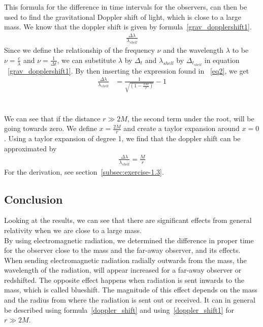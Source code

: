 \documentclass[reprint,english,notitlepage]{revtex4-2}
\begin{document}
        This formula for the difference in time intervals for the observers, can then be used to find the gravitational Doppler shift of light, which is close to a large mass.
        We know that the doppler shift is given by formula~\eqref{grav_dopplershift1}.
        \begin{align}
            \frac{\Delta \lambda}{\lambda_{shell}} \label{grav_dopplershift1}
        \end{align}
        Since we define the relationship of the frequency $\nu$ and the wavelength $\lambda$ to be $\nu = \frac{c}{\lambda}$ and $\nu = \frac{1}{\Delta t}$, we can substitute $\lambda$ by $\Delta_t$ and $\lambda_{shell}$ by $\Delta_t_{shell}$ in equation ~\eqref{grav_dopplershift1}.
        By then inserting the expression found in ~\eqref{eq2}, we get
        \begin{align}
            \frac{\Delta \lambda}{\lambda_{shell}} &= \frac{1}{\sqrt{\left(1-\frac{2M}{r}\right)}} - 1 \label{doppler_shift}
        \end{align}\\\\

        We can see that if the distance $r \gg 2M$, the second term under the root, will be going towards zero.
        We define $x = \frac{2M}{r}$ and create a taylor expansion around $x = 0$.
        Using a taylor expansion of degree 1, we find that the doppler shift can be approximated by
        \begin{align}
            \frac{\Delta \lambda}{\lambda_{shell}} = \frac{M}{r} \label{doppler_shift1}
        \end{align}
        For the derivation, see section~\ref{subsec:exercise-1.3}.
        


    \subsection{Conclusion}\label{subsec:conclusion1}
        Looking at the results, we can see that there are significant effects from general relativity when we are close to a large mass.\\
        By using electromagnetic radiation, we determined the difference in proper time for the observer close to the mass and the far-away observer, and its effects.\\

        When sending electromagnetic radiation radially outwards from the mass, the wavelength of the radiation, will appear increased for a far-away observer or redshifted.
        The opposite effect happens when radiation is sent inwards to the mass, which is called blueshift.
        The magnitude of this effect depends on the mass and the radius from where the radiation is sent out or received.
        It can in general be described using formula~\eqref{doppler_shift} and using~\eqref{doppler_shift1} for $r \gg 2M$.
\end{document}
